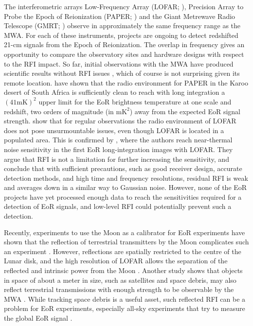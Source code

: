 \documentclass{pasa}
\begin{document}
The interferometric arrays Low-Frequency Array (LOFAR; \citealt{lofar-2013}), Precision Array to Probe the Epoch of Reionization (PAPER; \citealt{parsons-paper-eorlimit-2014}) and the Giant Metrewave Radio Telescope (GMRT; \citealt{the-gmrt-swarup-chapter-2013}) observe in approximately the same frequency range as the MWA. For each of these instruments, projects are ongoing to detect redshifted 21-cm signals from the Epoch of Reionization. The overlap in frequency gives an opportunity to compare the observatory sites and hardware designs with respect to the RFI impact. So far, initial observations with the MWA have produced scientific results without RFI issues \citep{hurley-walker-mwacs-2014, mckinley-fornaxa-2014, hindson-cluster-emission-2014}, which of course is not surprising given its remote location. \citet{parsons-paper-eorlimit-2014} have shown that the radio environment for PAPER in the Karoo desert of South Africa is sufficiently clean to reach with long integration a $(41 \textrm{mK})^2$ upper limit for the EoR brightness temperature at one scale and redshift, two orders of magnitude (in $\textrm{mK}^2$) away from the expected EoR signal strength. \citet{lofar-radio-environment} show that for regular observations the radio environment of LOFAR does not pose unsurmountable issues, even though LOFAR is located in a populated area. This is confirmed by \citet{ncp-eor-yatawatta}, where the authors reach near-thermal noise sensitivity in the first EoR long-integration images with LOFAR. They argue that RFI is not a limitation for further increasing the sensitivity, and \citet{offringa-rfi-distributions} conclude that with sufficient precautions, such as good receiver design, accurate detection methods, and high time and frequency resolutions, residual RFI is weak and averages down in a similar way to Gaussian noise. However, none of the EoR projects have yet processed enough data to reach the sensitivities required for a detection of EoR signals, and low-level RFI could potentially prevent such a detection.

Recently, experiments to use the Moon as a calibrator for EoR experiments have shown that the reflection of terrestrial transmitters by the Moon complicates such an experiment \citep{mckinley-moon-2013}. However, reflections are spatially restricted to the centre of the Lunar disk, and the high resolution of LOFAR allows the separation of the reflected and intrinsic power from the Moon \citep{vedantham-2014-todo}. Another study shows that objects in space of about a meter in size, such as satellites and space debris, may also reflect terrestrial transmissions with enough strength to be observable by the MWA \citep{tingay-space-debris-2013}. While tracking space debris is a useful asset, such reflected RFI can be a problem for EoR experiments, especially all-sky experiments that try to measure the global EoR signal \citep{vedantham-2014-todo}.
\end{document}
